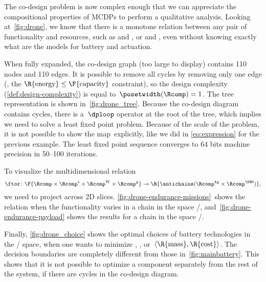 The co-design problem is now complex enough that we can appreciate
the compositional properties of MCDPs to perform a qualitative analysis.
Looking at~\cref{fig:drone}, we know that there is a monotone relation
between any pair of functionality and resources, such as 
and , or  and , even without knowing
exactly what are the models for battery and actuation.

When fully expanded, the co-design graph (too large to display) contains
110 nodes and 110 edges. It is possible to remove all cycles by removing
only one edge (\eg , the $\R{\text{energy}}\leq\text{\F{\text{capacity}}}$
constraint), so the design complexity (\cref{def:design-complexity})
is equal to~$\posetwidth(\Rcomp)=1$. The
tree representation is shown in~\cref{fig:drone_tree}. Because the
co-design diagram contains cycles, there is a~$\dploop$ operator
at the root of the tree, which implies we need to solve a least fixed
point problem. Because of the scale of the problem, it is not possible
to show the map~\ftor explicitly, like we did in \cref{eq:expression}
for the previous example. The least fixed point sequence converges
to 64 bits machine precision in 50--100 iterations.

To visualize the multidimensional relation
\[
  \ftor\colon\F{\Rcomp\times\Rcomp^{\text{s}}\times\Rcomp^{\text{W}}\times\Rcomp^{\text{g}}}\rightarrow\R{\antichains(\Rcomp^{\text{kg}}\times\Rcomp^{\USD})},
\]
we need to project across 2D slices. \cref{fig:drone-endurance-missions}~shows
the relation when the functionality varies in a chain in the space
/, and~\cref{fig:drone-endurance-payload}
shows the results for a chain in the space /.

Finally, \cref{fig:drone_choice} shows the optimal choices of battery
technologies in the / space, when one
wants to minimize , , or~$\left\langle \R{\text{mass}},\R{\text{cost}}\right\rangle $.
The decision boundaries are completely different from those in~\cref{fig:mainbattery}.
This shows that it is not possible to optimize a component separately
from the rest of the system, if there are cycles in the co-design
diagram.

